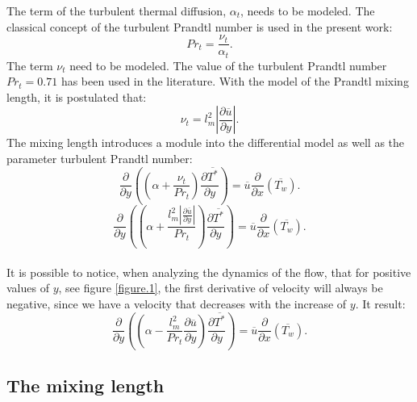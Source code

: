 \documentclass[10pt]{article} %
\begin{document}
The term of the turbulent thermal diffusion, $\alpha_t$, needs to be modeled. 
The classical concept of the turbulent Prandtl number is used in the present work:
\begin{equation}
Pr_t = \frac{\nu_t}{\alpha_t}.
\end{equation} 
The term $ \nu_t $ need to be modeled. The value of the turbulent Prandtl number $ Pr_t = 0.71 $ has been used in the literature.
With the model of the Prandtl mixing length, it is postulated that:
\begin{equation}
\nu_t = {l^2_m} \left| \frac{\partial \overline{u}}{\partial y} \right|.
\end{equation}
The mixing length introduces a module into the differential model as well as the parameter turbulent Prandtl number:
\\
\begin{equation}
{\frac{\partial{}}{\partial{y}}} \left( \left( \alpha   
+ \frac{\nu_t}{Pr_t} \right) \frac{\partial \overline{T^\ast}}{\partial y} \right)
= 
\overline{u}\frac{\partial{}}{\partial{x}}\left(\overline{T_w}\right)  .
\end{equation}
\begin{equation}\label{equationquasela}
{\frac{\partial{}}{\partial{y}}} \left( \left( \alpha   
+ \frac{{l^2_m} \left| \frac{\partial \overline{u}}{\partial y} \right|}{Pr_t} \right) \frac{\partial \overline{T^\ast}}{\partial y} \right)
= 
\overline{u}\frac{\partial{}}{\partial{x}}\left(\overline{T_w}\right)  .
\end{equation}
\\

It is possible to notice, when analyzing the dynamics of the flow, that for positive values of $ y $, see figure \ref{figure.1}, the first derivative of velocity will always be negative, since we have a velocity that decreases with the increase of $ y $. It result:\\
\begin{equation}
{\frac{\partial{}}{\partial{y}}} \left( \left( \alpha   
- \frac{{l^2_m}}{Pr_t}\frac{\partial \overline{u}}{\partial y} \right) \frac{\partial \overline{T^\ast}}{\partial y} \right)
= 
\overline{u}\frac{\partial{}}{\partial{x}}\left(\overline{T_w}\right)  .
\end{equation}



\subsection{The mixing length}
\end{document}
